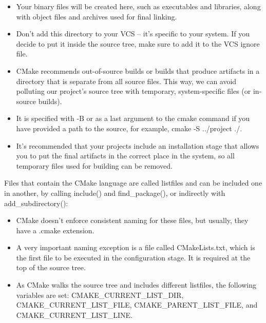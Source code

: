 \begin{itemize}
\item 
Your binary files will be created here, such as executables and libraries, along with object files and archives used for final linking.

\item 
Don't add this directory to your VCS – it's specific to your system. If you decide to put it inside the source tree, make sure to add it to the VCS ignore file.

\item 
CMake recommends out-of-source builds or builds that produce artifacts in a directory that is separate from all source files. This way, we can avoid polluting our project's source tree with temporary, system-specific files (or in-source builds).

\item 
It is specified with -B or as a last argument to the cmake command if you have provided a path to the source, for example, cmake -S ../project ./.

\item 
It's recommended that your projects include an installation stage that allows you to put the final artifacts in the correct place in the system, so all temporary files used for building can be removed.
\end{itemize}



Files that contain the CMake language are called listfiles and can be included one in another, by calling include() and find\_package(), or indirectly with add\_subdirectory():

\begin{itemize}
\item 
CMake doesn't enforce consistent naming for these files, but usually, they have a .cmake extension.

\item 
A very important naming exception is a file called CMakeLists.txt, which is the first file to be executed in the configuration stage. It is required at the top of the source tree.

\item 
As CMake walks the source tree and includes different listfiles, the following variables are set: CMAKE\_CURRENT\_LIST\_DIR, CMAKE\_CURRENT\_LIST\_FILE, CMAKE\_PARENT\_LIST\_FILE, and CMAKE\_CURRENT\_LIST\_LINE.
\end{itemize}

